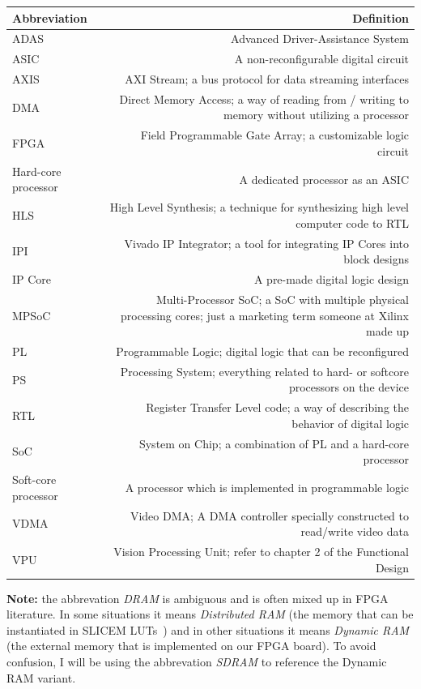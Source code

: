 \documentclass{matthijs}
\begin{document}

	\thispagestyle{empty}

	\begin{inhoudspagina}

		\clearpage

			\begin{tabular*}{\textwidth}{l @{\extracolsep{\fill}} R}
				\toprule

				\textbf{Abbreviation} & \textbf{Definition} \\
				\midrule

				ADAS & Advanced Driver-Assistance System \tabularnewline
				ASIC & A non-reconfigurable digital circuit \tabularnewline
				AXIS & AXI Stream; a bus protocol for data streaming interfaces \tabularnewline
				DMA & Direct Memory Access; a way of reading from / writing to memory without utilizing a processor \tabularnewline
				FPGA & Field Programmable Gate Array; a customizable logic circuit \tabularnewline
				Hard-core processor & A dedicated processor as an ASIC \tabularnewline
				HLS & High Level Synthesis; a technique for synthesizing high level computer code to RTL \tabularnewline
				IPI & Vivado IP Integrator; a tool for integrating IP Cores into block designs \tabularnewline
				IP Core & A pre-made digital logic design \tabularnewline
				MPSoC & Multi-Processor SoC; a SoC with multiple physical processing cores; just a marketing term someone at Xilinx made up \tabularnewline
				PL & Programmable Logic; digital logic that can be reconfigured \tabularnewline
				PS & Processing System; everything related to hard- or softcore processors on the device \tabularnewline
				RTL & Register Transfer Level code; a way of describing the behavior of digital logic \tabularnewline
				SoC & System on Chip; a combination of PL and a hard-core processor \tabularnewline
				Soft-core processor & A processor which is implemented in programmable logic \tabularnewline
				VDMA & Video DMA; A DMA controller specially constructed to read/write video data \tabularnewline
				VPU & Vision Processing Unit; refer to chapter 2 of the Functional Design \tabularnewline

				\bottomrule
			\end{tabular*}

		\vspace{3ex}

		\textbf{Note:} the abbrevation \textit{DRAM} is ambiguous and is often mixed up in FPGA literature.
		In some situations it means \textit{Distributed RAM} (the memory that can be instantiated in SLICEM LUTs~\cite{xilinxug474}) and in other situations it means \textit{Dynamic RAM} (the external memory that is implemented on our FPGA board).
		To avoid confusion, I will be using the abbrevation \textit{SDRAM} to reference the Dynamic RAM variant.

	\end{inhoudspagina}
\end{document}
